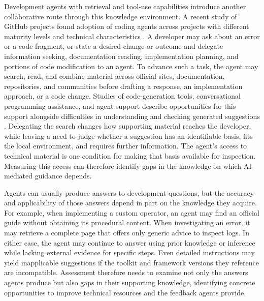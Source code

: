 \documentclass[manuscript,review,anonymous]{acmart}
\begin{document}
Development agents with retrieval and tool-use capabilities introduce another collaborative route through this knowledge environment. A recent study of GitHub projects found adoption of coding agents across projects with different maturity levels and technical characteristics \citep{robbes2026}. A developer may ask about an error or a code fragment, or state a desired change or outcome and delegate information seeking, documentation reading, implementation planning, and portions of code modification to an agent. To advance such a task, the agent may search, read, and combine material across official sites, documentation, repositories, and communities before drafting a response, an implementation approach, or a code change. Studies of code-generation tools, conversational programming assistance, and agent support describe opportunities for this support alongside difficulties in understanding and checking generated suggestions \citep{vaithilingam2022, barke2023, programmerAssistant2023}. Delegating the search changes how supporting material reaches the developer, while leaving a need to judge whether a suggestion has an identifiable basis, fits the local environment, and requires further information. The agent's access to technical material is one condition for making that basis available for inspection. Measuring this access can therefore identify gaps in the knowledge on which AI-mediated guidance depends.

Agents can usually produce answers to development questions, but the accuracy and applicability of those answers depend in part on the knowledge they acquire. For example, when implementing a custom operator, an agent may find an official guide without obtaining its procedural content. When investigating an error, it may retrieve a complete page that offers only generic advice to inspect logs. In either case, the agent may continue to answer using prior knowledge or inference while lacking external evidence for specific steps. Even detailed instructions may yield inapplicable suggestions if the toolkit and framework versions they reference are incompatible. Assessment therefore needs to examine not only the answers agents produce but also gaps in their supporting knowledge, identifying concrete opportunities to improve technical resources and the feedback agents provide.
\end{document}
